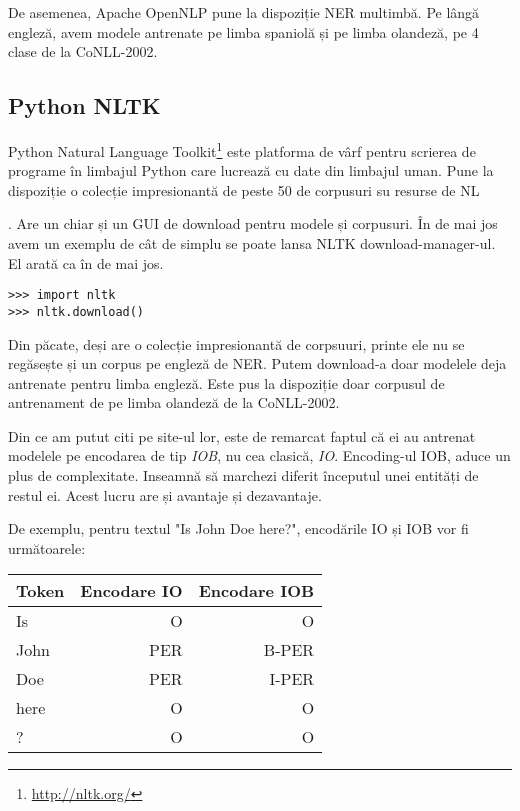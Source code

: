 De asemenea, Apache OpenNLP pune la dispoziție NER multimbă. Pe lângă engleză, avem modele antrenate pe limba spaniolă și pe limba olandeză, pe 4 clase de la CoNLL-2002.

\subsection{Python NLTK}

Python Natural Language Toolkit\footnote{\url{http://nltk.org/}} este platforma de vârf pentru scrierea de programe în limbajul Python care lucrează cu date din limbajul uman. Pune la dispoziție  o colecție impresionantă de peste 50 de corpusuri su resurse de NL{. Are un chiar și un GUI de download pentru modele și corpusuri. În  de mai jos avem un exemplu de cât de simplu se poate lansa NLTK download-manager-ul. El arată ca în  de mai jos.

\lstset{language=python,caption=Python NLTK,label=lst:python-nltk}
\begin{lstlisting}
>>> import nltk
>>> nltk.download()
\end{lstlisting}


Din păcate, deși are o colecție impresionantă de corpsuuri, printe ele nu se regăsește și un corpus pe engleză de NER. Putem download-a doar modelele deja antrenate pentru limba engleză. Este pus la dispoziție doar corpusul de antrenament de pe limba olandeză de la CoNLL-2002.

Din ce am putut citi pe site-ul lor, este de remarcat faptul că ei au antrenat modelele pe encodarea de tip \textit{IOB}, nu cea clasică, \textit{IO}. Encoding-ul IOB,  aduce un plus de complexitate. Inseamnă să marchezi diferit începutul unei entități de restul ei. Acest lucru are și avantaje și dezavantaje.


De exemplu, pentru textul "Is John Doe here?", encodările IO și IOB vor fi următoarele:

\begin{center}
\begin{tabular}{ |l | r | r |}
\hline
  Token & Encodare IO & Encodare IOB \\
\hline
  Is & O & O \\
  John & PER & B-PER  \\
  Doe & PER & I-PER \\
  here & O & O \\
  ? & O & O \\
  \hline
\end{tabular}
\end{center}


}
